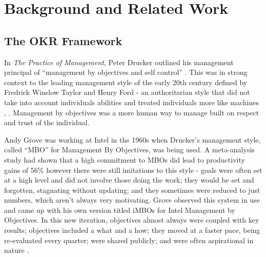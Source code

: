 \documentclass[sigconf, nonacm]{acmart}
\begin{document}





\section{Background and Related Work}
\subsection{The OKR Framework}
In \textit{The Practice of Management}, Peter Drucker outlined his management principal of ``management by objectives and self control'' \cite{mbo}. This was in strong context to the leading management style of the early 20th century defined by Fredrick Winslow Taylor and Henry Ford - an authoritarian style that did not take into account individuals abilities and treated individuals more like machines \cite{taylor}, \cite{ford}. Management by objectives was a more human way to manage built on respect and trust of the individual.

Andy Grove was working at Intel in the 1960s when Drucker's management style, called ``MBO'' for Management By Objectives, was being used. A meta-analysis study had shown that a high commitment to MBOs did lead to productivity gains of 56\% \cite{rodgers} however there were still imitations to this style - goals were often set at a high level and did not involve those doing the work; they would be set and forgotten, stagnating without updating; and they sometimes were reduced to just numbers, which aren't always very motivating. Grove observed this system in use and came up with his own version titled iMBOs for Intel Management by Objectives. In this new iteration, objectives almost always were coupled with key results; objectives included a what and a how; they moved at a faster pace, being re-evaluated every quarter; were shared publicly; and were often aspirational in nature \cite{Doerr01}. 
\end{document}
